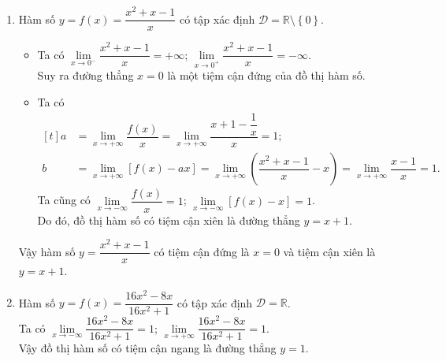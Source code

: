 \begin{bt}
{\begin{enumerate}
			\item Hàm số $y=f(x)=\dfrac{x^{2}+x-1}{x}$ có tập xác định $\mathscr{D}=\mathbb{R} \setminus \left\lbrace 0\right\rbrace$.
			\begin{itemize}
				\item Ta có $\lim\limits_{x \rightarrow 0^{-}} \dfrac{x^{2}+x-1}{x}=+\infty$; $\lim\limits_{x \rightarrow 0^{+}} \dfrac{x^{2}+x-1}{x}=-\infty$.\\
				Suy ra đường thẳng $x=0$ là một tiệm cận đứng của đồ thị hàm số.
				\item Ta có $\begin{aligned}[t]
					a&=\lim\limits_{x \rightarrow+\infty} \dfrac{f(x)}{x}=\lim\limits_{x \rightarrow+\infty} \dfrac{x+1-\dfrac{1}{x}}{x}=1;\\
					b&=\lim\limits_{x \rightarrow+\infty}[f(x)-ax]=\lim\limits_{x \rightarrow+\infty}\left(\dfrac{x^{2}+x-1}{x}-x\right)=\lim\limits_{x \rightarrow+\infty} \dfrac{x-1}{x}=1.
				\end{aligned}$\\
				Ta cũng có $\lim\limits_{x \rightarrow-\infty} \dfrac{f(x)}{x}=1$; $\lim\limits_{x \rightarrow-\infty}[f(x)-x]=1$.\\
				Do đó, đồ thị hàm số có tiệm cận xiên là đường thẳng $y=x+1$.
			\end{itemize}
			Vậy hàm số $y=\dfrac{x^{2}+x-1}{x}$ có tiệm cận đứng là $x=0$ và tiệm cận xiên là $y=x+1$.
			\item Hàm số $y=f(x)=\dfrac{16x^{2}-8x}{16x^{2}+1}$ có tập xác định $\mathscr{D}=\mathbb{R}$.\\
			Ta có $\lim\limits_{x \rightarrow -\infty} \dfrac{16x^{2}-8x}{16x^{2}+1}=1$; $\lim\limits_{x \rightarrow+\infty} \dfrac{16x^{2}-8x}{16x^{2}+1}=1$.\\
			Vậy đồ thị hàm số có tiệm cận ngang là đường thẳng $y=1$.
		\end{enumerate}
	}
\end{bt}

